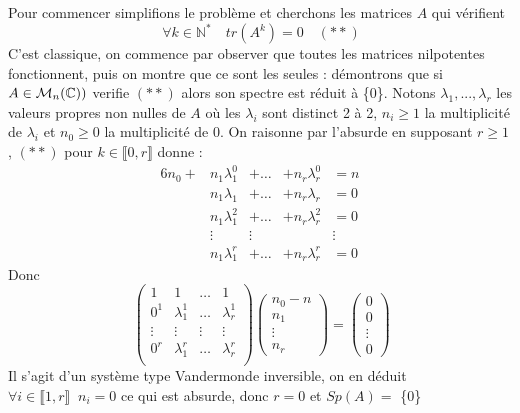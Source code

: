 \documentclass[letterpaper,10pt]{article}
\begin{document}
{
Pour commencer simplifions le problème et cherchons les matrices $A$ qui vérifient \[\
\forall k \in \mathbb{N^*}\quad tr(A^k) = 0
\quad (**) \] C'est classique, on commence par observer que toutes les matrices 
nilpotentes fonctionnent, puis on montre que ce sont les seules :
 démontrons que si $A \in \mathcal{M}_n(\mathbb{C})) $ verifie $(**)$ alors son
  spectre est réduit à \{0\}. Notons $ \lambda_1,..., \lambda_r$ les valeurs propres non nulles de $A$ où les $\lambda_i$ sont distinct 2 à 2, $n_i \geq 1$ la multiplicité de $\lambda_i$ et $n_0 \geq 0$ la multiplicité de 0. On raisonne par l'absurde en supposant $r \geq 1$,
$(**)$ pour $k\in \llbracket 0, r \rrbracket $ donne : 
\begin{alignat*}{6}
n_0 + &n_1\lambda_1^0 &+\ldots &+n_r\lambda_r^0 & = n\\
&n_1\lambda_1 &+\ldots&+n_r\lambda_r  &= 0\\
&n_1\lambda_1^2 &+\ldots&+n_r\lambda_r^2 &= 0 \\
&\vdots &\vdots  & & \vdots \\
&n_1\lambda_1^{r} &+\ldots&+n_r\lambda_r^{r} &= 0
\end{alignat*}
Donc 
\[\ \begin{pmatrix}
1 & 1 &\ldots & 1 \\
0^1 & \lambda_1^1 & \ldots & \lambda_r^1 \\
\vdots & \vdots & \vdots & \vdots \\
0^r & \lambda_1^r & \ldots & \lambda_r^r \\
\end{pmatrix}\begin{pmatrix}n_0-n \\ n_1\\ \vdots \\ n_r
\end{pmatrix}
=\begin{pmatrix}0 \\ 0\\ \vdots \\ 0
\end{pmatrix}\]
Il s'agit d'un système type Vandermonde  inversible,
on en déduit $\forall i \in\llbracket 1, r\rrbracket \;\; n_i = 0 $ ce qui est absurde, donc $r = 0$ et $Sp(A) =$ \{0\}

}
\end{document}

